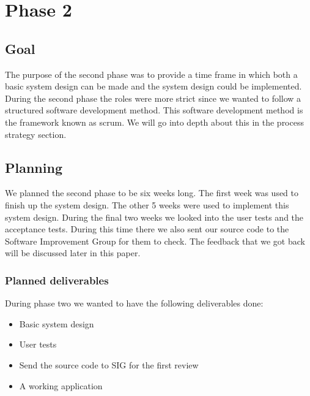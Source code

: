 \section{Phase 2}
\subsection{Goal}
The purpose of the second phase was to provide a time frame in which both a basic system design can be made and the system design could be implemented.
During the second phase the roles were more strict since we wanted to follow a structured software development method.
This software development method is the framework known as scrum.
We will go into depth about this in the process strategy section.

\subsection{Planning}
We planned the second phase to be six weeks long.
The first week was used to finish up the system design.
The other 5 weeks were used to implement this system design.
During the final two weeks we looked into the user tests and the acceptance tests.
During this time there we also sent our source code to the Software Improvement Group for them to check.
The feedback that we got back will be discussed later in this paper.

\subsubsection{Planned deliverables}
During phase two we wanted to have the following deliverables done:
\begin{itemize}
\item Basic system design
\item User tests
\item Send the source code to SIG for the first review
\item A working application
\end{itemize}

